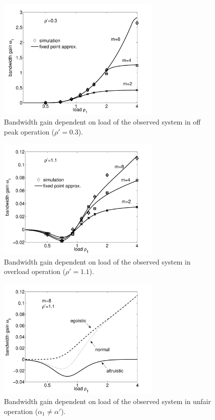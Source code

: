 \begin{figure}[tb]
	\centering
	\includegraphics[width=0.7\textwidth]{aggregation/performance_model/figures/fp_bwgain_rho03}
 	\caption{Bandwidth gain dependent on load of the observed system in off peak operation ($\rho'=0.3$).}
 	\label{fig:fp_bwgain_rho03}
\end{figure}

\begin{figure}[tb]
	\centering
	\includegraphics[width=0.7\textwidth]{aggregation/performance_model/figures/fp_bwgain_rho11}
 	\caption{Bandwidth gain dependent on load of the observed system in overload operation ($\rho'=1.1$).}
 	\label{fig:fp_bwgain_rho11}
\end{figure}

\begin{figure}[tb]
	\centering
	\includegraphics[width=0.7\textwidth]{aggregation/performance_model/figures/fp_bwgain_prio11}
 	\caption{Bandwidth gain dependent on load of the observed system in unfair operation ($\alpha_1 \neq \alpha'$).}
 	\label{fig:fp_bwgain_prio11}
\end{figure}

